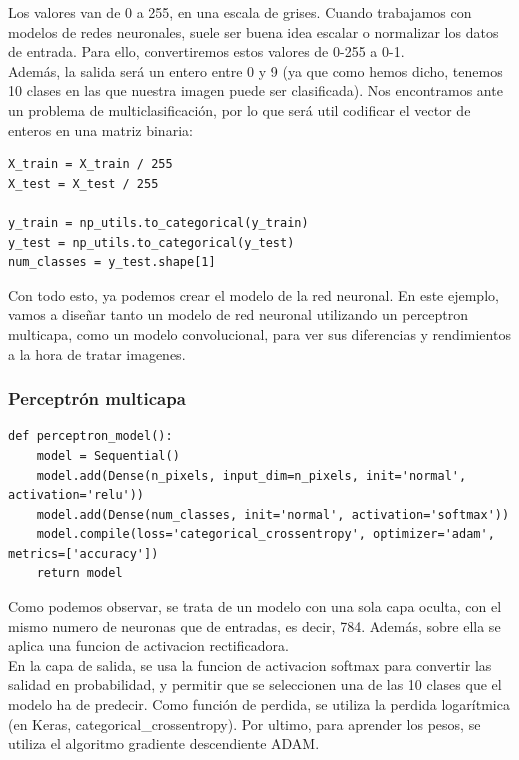 Los valores van de 0 a 255, en una escala de grises. Cuando trabajamos con modelos de redes neuronales, suele ser buena idea escalar o normalizar los datos de entrada. Para ello, convertiremos estos valores de 0-255 a 0-1.\\
Además, la salida será un entero entre 0 y 9 (ya que como hemos dicho, tenemos 10 clases en las que nuestra imagen puede ser clasificada). Nos encontramos ante un problema de multiclasificación, por lo que será util codificar el vector de enteros en una matriz binaria:
\begin{verbatim}
X_train = X_train / 255
X_test = X_test / 255

y_train = np_utils.to_categorical(y_train)
y_test = np_utils.to_categorical(y_test)
num_classes = y_test.shape[1]
\end{verbatim}

Con todo esto, ya podemos crear el modelo de la red neuronal. En este ejemplo, vamos a diseñar tanto un modelo de red neuronal utilizando un perceptron multicapa, como un modelo convolucional, para ver sus diferencias y rendimientos a la hora de tratar imagenes.\\
\subsubsection{Perceptrón multicapa}
\begin{verbatim}
def perceptron_model():
	model = Sequential()
	model.add(Dense(n_pixels, input_dim=n_pixels, init='normal', activation='relu'))
	model.add(Dense(num_classes, init='normal', activation='softmax'))
	model.compile(loss='categorical_crossentropy', optimizer='adam', metrics=['accuracy'])
	return model
\end{verbatim}
Como podemos observar, se trata de un modelo con una sola capa oculta, con el mismo numero de neuronas que de entradas, es decir, 784. Además, sobre ella se aplica una funcion de activacion rectificadora.\\
En la capa de salida, se usa la funcion de activacion softmax para convertir las salidad en probabilidad, y permitir que se seleccionen una de las 10 clases que el modelo ha de predecir. Como función de perdida, se utiliza la perdida logarítmica (en Keras, categorical\_crossentropy). Por ultimo, para aprender los pesos, se utiliza el algoritmo gradiente descendiente ADAM.\\
